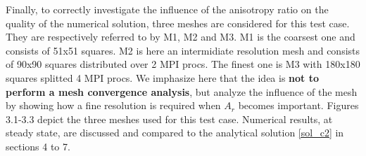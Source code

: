 Finally, to correctly investigate the influence of the anisotropy ratio on the quality of the numerical solution, three meshes are considered for this test case. They are respectively referred to by M1, M2 and M3. M1 is the coarsest one and consists of 51x51 squares. M2 is here an intermidiate resolution mesh and consists of 90x90 squares distributed over 2 MPI procs. The finest one is M3 with 180x180 squares splitted 4 MPI procs. We imphasize here that the idea is \textbf{not to perform a mesh convergence analysis}, but analyze the influence of the mesh by showing how a fine resolution is required when $A_r$ becomes important. Figures 3.1-3.3 depict the three meshes used for this test case. Numerical results, at steady state, are discussed and compared to the analytical solution \eqref{sol_c2} in sections 4 to 7.


